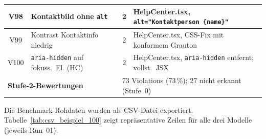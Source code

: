\begin{longtable}{|c|p{5.0cm}|c|p{5.4cm}|}
V98  & Kontaktbild ohne \texttt{alt}                & 2 & HelpCenter.tsx, \texttt{alt="Kontaktperson \{name\}"} \\ \hline
V99  & Kontrast Kontaktinfo niedrig                 & 2 & HelpCenter.tsx, CSS-Fix mit konformem Grauton \\ \hline
V100 & \texttt{aria-hidden} auf fokuss.\ El. (HC)   & 2 & HelpCenter.tsx, \texttt{aria-hidden} entfernt; vollst.\ JSX \\ \hline
\multicolumn{2}{|l|}{\textbf{Stufe-2-Bewertungen}} & \multicolumn{2}{l|}{73 Violations (73\,\%); 27 nicht erkannt (Stufe~0)} \\
\hline
\end{longtable}



\label{app:csv_beispiel_100}

Die Benchmark-Rohdaten wurden als CSV-Datei exportiert. Tabelle~\ref{tab:csv_beispiel_100} zeigt repräsentative Zeilen für alle drei Modelle (jeweils Run~01).

\begin{table}[htbp]
\centering
\setlength{\tabcolsep}{3.5pt}
\renewcommand{\arraystretch}{1.15}
\caption[Beispielzeilen aus dem CSV-Export (test-100)]{Repräsentative Beispielzeilen aus \texttt{results/benchmark/summary.csv} (test-100-Suite; jeweils Run~01 pro Modell). \texttt{num\_predict}~=~12\,288; Dauer in Millisekunden.}
%
\label{tab:csv_beispiel_100}
\end{table}



\label{app:statistik_quantile_100}

